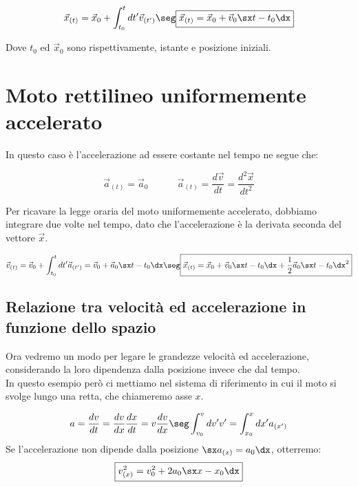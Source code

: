 \begin{equation}
\vec x_{(t)} = \vec x_0 + \int_{t_0}^{t}dt' \vec v_{(t')}\seg\boxed{\vec x_{(t)} = \vec x_0 +\vec v_0\sx t - t_0\dx}
\end{equation}

Dove $t_0$ ed $\vec x_0$ sono rispettivamente, istante e posizione iniziali.  

\section{Moto rettilineo uniformemente accelerato}
In questo caso è l'accelerazione ad essere costante nel tempo ne segue che:
 
 \begin{equation}
\vec a_{(t)} = \vec a_0 \quad\quad\quad \vec a_{(t)} = \frac{d\vec v}{dt} = \frac{d^2\vec x}{dt^2}
\end{equation}

Per ricavare la legge oraria del moto uniformemente accelerato, dobbiamo integrare due volte nel tempo, dato che l'accelerazione è la derivata seconda del vettore $\vec x$.

 \begin{equation}
\vec v_{(t)} = \vec v_0 + \int_{t_0}^{t}dt' \vec a_{(t')} =  \vec v_0 +  \vec a_0\sx t - t_0\dx\seg  \boxed{\vec x_{(t)} = \vec x_0 +\vec v_0\sx t - t_0\dx + \frac12\vec a_0\sx t-t_0\dx^2}
\end{equation}


\subsection{Relazione tra velocità ed accelerazione in funzione dello spazio}
Ora vedremo un modo per legare le grandezze velocità ed accelerazione, considerando la loro dipendenza dalla posizione invece che dal tempo.\\ In questo esempio però ci mettiamo nel sistema di riferimento in cui il moto si svolge lungo una retta, che chiameremo asse $x$.

\begin{equation}
a = \frac{dv}{dt} = \frac{dv}{dx}\frac{dx}{dt} = v\frac{dv}{dx}\seg \int_{v_0}^{v}dv'v' = \int_{x_0}^{x}dx'a_{(x')}
\end{equation}
Se l'accelerazione non dipende dalla posizione $\sx a_{(x)} = a_0\dx$, otterremo:
\begin{equation}
\boxed{v^2_{(x)} = v_0^2 + 2a_0\sx x-x_0\dx}
\end{equation}

